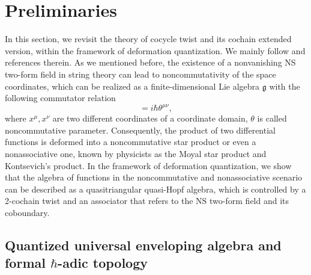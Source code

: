 \documentclass[reqno]{amsart}
\theoremstyle{definition}
\theoremstyle{remark}
\begin{document}
    \section{Preliminaries}\label{sec:Preliminaries}
    In this section, we revisit the theory of cocycle twist and its cochain extended version, within the framework of deformation quantization. We mainly follow \cite{Dr3,Drinfeld1990QuasiHopf,Drinfeld1991Quasitriangular,majid2000foundations} and references therein. As we mentioned before, the existence of a nonvanishing NS two-form field in string theory can lead to noncommutativity of the space coordinates, which can be realized as a finite-dimensional Lie algebra $\mathfrak{g}$ with the following commutator relation \cite{seiberg1999string,plauschinn2019non,blumenhagen2014course}
    \begin{equation}
        [x^\mu,x^\nu] = i\hbar \theta^{\mu\nu},
    \end{equation}
where $x^\mu, x^\nu$ are two different coordinates of a coordinate domain, $\theta$ is called noncommutative parameter. Consequently, the product of two differential functions is deformed into a noncommutative star product or even a nonassociative one, known by physicists as the Moyal star product and Kontsevich's product. In the framework of deformation quantization, we show that the algebra of functions in the noncommutative and nonassociative scenario can be described as a quasitriangular quasi-Hopf algebra, which is controlled by a 2-cochain twist and an associator that refers to the NS two-form field and its coboundary.

\subsection{Quantized universal enveloping algebra and formal $\hbar$-adic topology}
\end{document}
